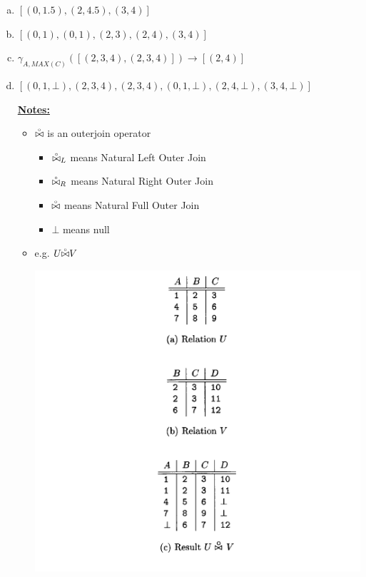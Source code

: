 \documentclass[12pt]{article}
\begin{document}
\begin{enumerate}[1.]
\begin{enumerate}[a)]
\begin{itemize}
        \end{itemize}

        \item $[(0, 1.5), (2, 4.5), (3,4)]$
        \item $[(0,1),(0,1),(2,3),(2,4),(3,4)]$
        \item $\gamma_{A, MAX(C)}([(2,3,4),(2,3,4)]) \to [(2,4)]$
        \item $[(0,1,\bot),(2,3,4), (2,3,4),(0,1,\bot),(2,4,\bot),(3,4,\bot)]$

        \bigskip

        \underline{\textbf{Notes:}}

        \bigskip

        \begin{itemize}
            \item $\accentset{\circ}{\bowtie}$ is an outerjoin operator
            \begin{itemize}
                \item $\accentset{\circ}{\bowtie}_L$ means Natural Left Outer Join
                \item $\accentset{\circ}{\bowtie}_R$ means Natural Right Outer Join
                \item $\accentset{\circ}{\bowtie}$ means Natural Full Outer Join
                \item $\bot$ means null
            \end{itemize}


            \item e.g. $U \accentset{\circ}{\bowtie} V$

            \bigskip

            \begin{center}
            \includegraphics[width=0.7\linewidth]{images/worksheet_4_solution_2.png}
            \end{center}


\end{itemize}
\end{enumerate}
\end{enumerate}
\end{document}
